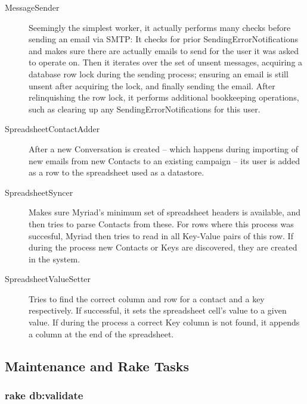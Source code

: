 \begin{description}
\item[MessageSender] Seemingly the simplest worker, it actually performs many checks before sending an email via SMTP: It checks for prior SendingErrorNotifications and makes sure there are actually emails to send for the user it was asked to operate on. Then it iterates over the set of unsent messages, acquiring a database row lock during the sending process; ensuring an email is still unsent after acquiring the lock, and finally sending the email. After relinquishing the row lock, it performs additional bookkeeping operations, such as clearing up any SendingErrorNotifications for this user.

\item[SpreadsheetContactAdder] After a new Conversation is created -- which happens during importing of new emails from new Contacts to an existing campaign -- its user is added as a row to the spreadsheet used as a datastore.

\item[SpreadsheetSyncer] Makes sure Myriad's minimum set of spreadsheet headers is available, and then tries to parse Contacts from these. For rows where this process was succesful, Myriad then tries to read in all Key-Value pairs of this row. If during the process new Contacts or Keys are discovered, they are created in the system.

\item[SpreadsheetValueSetter] Tries to find the correct column and row for a contact and a key respectively. If successful, it sets the spreadsheet cell's value to a given value. If during the process a correct Key column is not found, it appends a column at the end of the spreadsheet.

\end{description}

\subsection{Maintenance and Rake Tasks}

\subsubsection{rake db:validate}

